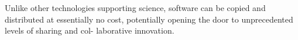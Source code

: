 Unlike other technologies supporting science, software can
be copied and distributed at essentially no cost, potentially
opening the door to unprecedented levels of sharing and col-
laborative innovation. \cite{howison2011scientific}




